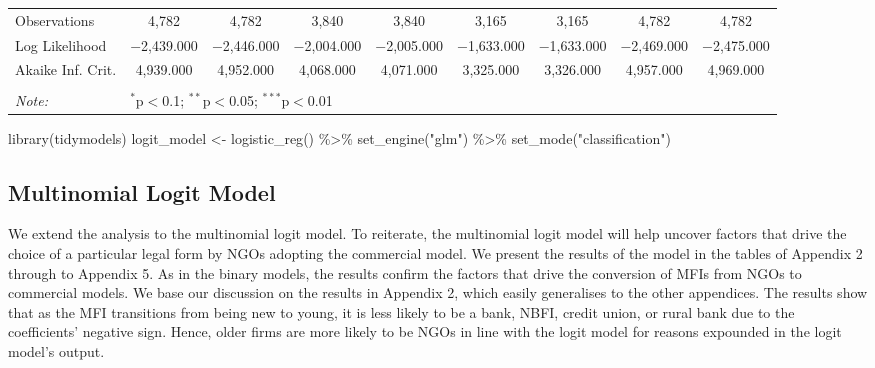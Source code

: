 \documentclass[a4paper,nobind]{templates/ociamthesis}
\newenvironment{Shaded}{\begin{snugshade}}{\end{snugshade}}
\newcommand{\FunctionTok}[1]{\textcolor[rgb]{0.00,0.00,0.00}{#1}}
\newcommand{\NormalTok}[1]{#1}
\newcommand{\OtherTok}[1]{\textcolor[rgb]{0.56,0.35,0.01}{#1}}
\newcommand{\SpecialCharTok}[1]{\textcolor[rgb]{0.00,0.00,0.00}{#1}}
\newcommand{\StringTok}[1]{\textcolor[rgb]{0.31,0.60,0.02}{#1}}
\renewenvironment{Shaded}
{
  \vspace{10pt}%
  \begin{snugshade}%
}{%
  \end{snugshade}%
  \vspace{8pt}%
}
\begin{document}
\begin{landscape}
\begin{table}[!htbp]
\begin{tabular}{@{\extracolsep{5pt}}lcccccccc}
Observations & 4,782 & 4,782 & 3,840 & 3,840 & 3,165 & 3,165 & 4,782 & 4,782 \\ 
Log Likelihood & $-$2,439.000 & $-$2,446.000 & $-$2,004.000 & $-$2,005.000 & $-$1,633.000 & $-$1,633.000 & $-$2,469.000 & $-$2,475.000 \\ 
Akaike Inf. Crit. & 4,939.000 & 4,952.000 & 4,068.000 & 4,071.000 & 3,325.000 & 3,326.000 & 4,957.000 & 4,969.000 \\ 
\hline 
\hline \\[-1.8ex] 
\textit{Note:}  & \multicolumn{8}{l}{$^{*}$p$<$0.1; $^{**}$p$<$0.05; $^{***}$p$<$0.01} \\ 
\end{tabular} 
\end{table}

\end{landscape}

\newpage

\begin{Shaded}
\begin{Highlighting}[]
\FunctionTok{library}\NormalTok{(tidymodels)}
\NormalTok{logit\_model }\OtherTok{\textless{}{-}} \FunctionTok{logistic\_reg}\NormalTok{() }\SpecialCharTok{\%\textgreater{}\%} 
  \FunctionTok{set\_engine}\NormalTok{(}\StringTok{"glm"}\NormalTok{) }\SpecialCharTok{\%\textgreater{}\%} 
  \FunctionTok{set\_mode}\NormalTok{(}\StringTok{"classification"}\NormalTok{)}
\end{Highlighting}
\end{Shaded}

\hypertarget{multinomial-logit-model}{%
\subsection{Multinomial Logit Model}\label{multinomial-logit-model}}

We extend the analysis to the multinomial logit model. To reiterate, the multinomial logit model will help uncover factors that drive the choice of a particular legal form by NGOs adopting the commercial model. We present the results of the model in the tables of Appendix 2 through to Appendix 5. As in the binary models, the results confirm the factors that drive the conversion of MFIs from NGOs to commercial models. We base our discussion on the results in Appendix 2, which easily generalises to the other appendices. The results show that as the MFI transitions from being new to young, it is less likely to be a bank, NBFI, credit union, or rural bank due to the coefficients' negative sign. Hence, older firms are more likely to be NGOs in line with the logit model for reasons expounded in the logit model's output.
\end{document}

